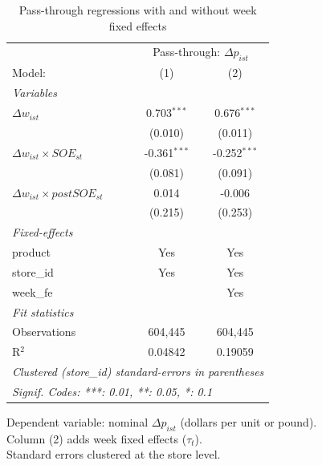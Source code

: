 
\begin{table}[htbp]
   \caption{\label{tab:passthrough_reg} Pass-through regressions with and without week fixed effects}
   \centering
   \begin{tabular}{lcc}
      \tabularnewline \midrule \midrule
       & \multicolumn{2}{c}{Pass-through: $\Delta p_{ist}$} \\ 
      Model:                                 & (1)            & (2)\\  
      \midrule
      \emph{Variables}\\
      $\Delta w_{ist}$                       & 0.703$^{***}$  & 0.676$^{***}$\\   
                                             & (0.010)        & (0.011)\\   
      $\Delta w_{ist} \times SOE_{st}$       & -0.361$^{***}$ & -0.252$^{***}$\\   
                                             & (0.081)        & (0.091)\\   
      $\Delta w_{ist} \times postSOE_{st}$   & 0.014          & -0.006\\   
                                             & (0.215)        & (0.253)\\   
      \midrule
      \emph{Fixed-effects}\\
      product                                & Yes            & Yes\\  
      store\_id                              & Yes            & Yes\\  
      week\_fe                               &                & Yes\\  
      \midrule
      \emph{Fit statistics}\\
      Observations                           & 604,445        & 604,445\\  
      R$^2$                                  & 0.04842        & 0.19059\\  
      \midrule \midrule
      \multicolumn{3}{l}{\emph{Clustered (store\_id) standard-errors in parentheses}}\\
      \multicolumn{3}{l}{\emph{Signif. Codes: ***: 0.01, **: 0.05, *: 0.1}}\\
   \end{tabular}
   
   \par \raggedright 
   Dependent variable: nominal $\Delta p_{ist}$ (dollars per unit or pound).\\
   Column (2) adds week fixed effects ($\tau_t$).\\
   Standard errors clustered at the store level.
\end{table}


